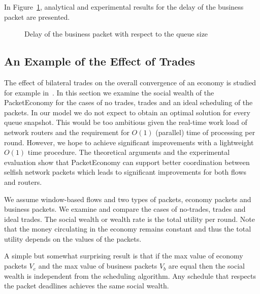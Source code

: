 \documentclass[letterpaper,10pt]{llncs}
\begin{document}
In Figure~\ref{fig:Delays}, analytical and experimental results for the delay of the business packet are presented.

\begin{figure}[!h]
\hspace{0.1\textwidth}
\caption{Delay of the business packet with respect to the queue size} \label{fig:Delays}
\end{figure}

\subsection{An Example of the Effect of Trades}
\label{sec:anarchy}

The effect of bilateral trades on the overall convergence of an economy is studied for 
example in~\cite{Feldman:1973:Bilateral}. In this section we examine the social wealth 
of the PacketEconomy for the cases of no trades, trades and an ideal scheduling of the packets.  
In our model we do not expect to obtain an optimal solution for every queue snapshot. 
This would be too ambitious
given the real-time work load of network routers and the requirement 
for $O(1)$ (parallel) time of processing per round. 
However, we hope to achieve significant improvements with a lightweight 
$O(1)$ time procedure. The theoretical arguments and the experimental
evaluation show that PacketEconomy can support better coordination between selfish network packets 
which leads to significant improvements for both flows and routers.

We assume window-based flows and two types of packets, economy packets and business packets.
We examine and compare the cases of no-trades, trades and ideal trades.
The social wealth or wealth rate is the total utility per round. Note that the money 
circulating in the economy remains constant and thus the total utility depends on the 
values of the packets.

A simple but somewhat surprising result is that if the max value
of economy packets $V_e$ and the max value of business packets $V_b$ are
equal then the social wealth is independent from the scheduling algorithm.
Any schedule that respects the packet deadlines achieves the same
social wealth.
\end{document}
